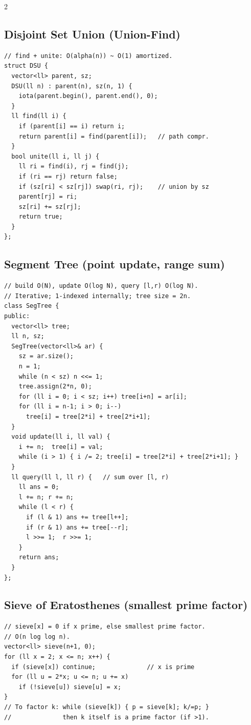 \documentclass[10pt,letterpaper]{extarticle}
\newenvironment{block}[1]
  {\subsection*{#1}\nopagebreak}
  {\par\addvspace{2pt}}
\begin{document}
\begin{multicols*}{2}
\begin{block}{Disjoint Set Union (Union-Find)}
\begin{lstlisting}
// find + unite: O(alpha(n)) ~ O(1) amortized.
struct DSU {
  vector<ll> parent, sz;
  DSU(ll n) : parent(n), sz(n, 1) {
    iota(parent.begin(), parent.end(), 0);
  }
  ll find(ll i) {
    if (parent[i] == i) return i;
    return parent[i] = find(parent[i]);   // path compr.
  }
  bool unite(ll i, ll j) {
    ll ri = find(i), rj = find(j);
    if (ri == rj) return false;
    if (sz[ri] < sz[rj]) swap(ri, rj);    // union by sz
    parent[rj] = ri;
    sz[ri] += sz[rj];
    return true;
  }
};
\end{lstlisting}
\end{block}

\begin{block}{Segment Tree (point update, range sum)}
\begin{lstlisting}
// build O(N), update O(log N), query [l,r) O(log N).
// Iterative; 1-indexed internally; tree size = 2n.
class SegTree {
public:
  vector<ll> tree;
  ll n, sz;
  SegTree(vector<ll>& ar) {
    sz = ar.size();
    n = 1;
    while (n < sz) n <<= 1;
    tree.assign(2*n, 0);
    for (ll i = 0; i < sz; i++) tree[i+n] = ar[i];
    for (ll i = n-1; i > 0; i--)
      tree[i] = tree[2*i] + tree[2*i+1];
  }
  void update(ll i, ll val) {
    i += n;  tree[i] = val;
    while (i > 1) { i /= 2; tree[i] = tree[2*i] + tree[2*i+1]; }
  }
  ll query(ll l, ll r) {   // sum over [l, r)
    ll ans = 0;
    l += n; r += n;
    while (l < r) {
      if (l & 1) ans += tree[l++];
      if (r & 1) ans += tree[--r];
      l >>= 1;  r >>= 1;
    }
    return ans;
  }
};
\end{lstlisting}
\end{block}

\begin{block}{Sieve of Eratosthenes (smallest prime factor)}
\begin{lstlisting}
// sieve[x] = 0 if x prime, else smallest prime factor.
// O(n log log n).
vector<ll> sieve(n+1, 0);
for (ll x = 2; x <= n; x++) {
  if (sieve[x]) continue;              // x is prime
  for (ll u = 2*x; u <= n; u += x)
    if (!sieve[u]) sieve[u] = x;
}
// To factor k: while (sieve[k]) { p = sieve[k]; k/=p; }
//              then k itself is a prime factor (if >1).
\end{lstlisting}
\end{block}


\end{multicols*}
\end{document}

